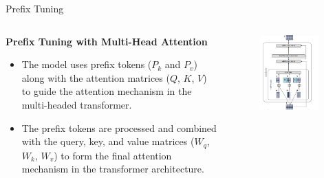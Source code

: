 \documentclass[serif, aspectratio=169]{beamer}
\begin{document}
\begin{frame}{Prefix Tuning}
    \begin{columns}
        \begin{column}{0.5\textwidth}
            \textbf{Prefix Tuning with Multi-Head Attention}
            \begin{itemize}
                \item The model uses prefix tokens (\( P_k \) and \( P_v \)) along with the attention matrices (\( Q \), \( K \), \( V \)) to guide the attention mechanism in the multi-headed transformer.
                \vspace{0.3cm}
                \item The prefix tokens are processed and combined with the query, key, and value matrices (\( W_q \), \( W_k \), \( W_v \)) to form the final attention mechanism in the transformer architecture.
            \end{itemize}
        \end{column}

        \begin{column}{0.5\textwidth}
            \begin{figure}
            \centering
            \includegraphics[width=0.9\textwidth, height=0.75\textheight]{pic/Prefix tuning1.PNG}
            \end{figure}
        \end{column}

    \end{columns}
\end{frame}
\end{document}
